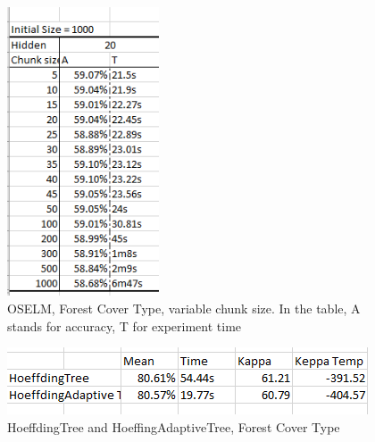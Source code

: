 \documentclass[a4paper, 14pt]{extarticle}
\begin{document}
 \begin{figure}[H]
\centering
\includegraphics[width=0.4\textwidth]{8.png}
\caption{\label{fig:OSELMCHUNKSIZE}OSELM, Forest Cover Type, variable chunk size. In the table, A stands for accuracy, T for experiment time }
\end{figure}
  
 \begin{figure}[H]
\centering
\includegraphics[width=\textwidth]{9.png}
\caption{\label{fig:HeoTree-HoeAdaptive}HoeffdingTree and HoeffingAdaptiveTree, Forest Cover Type}
\end{figure}
\end{document}
